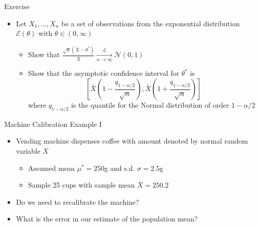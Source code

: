 \documentclass{beamer}
\begin{document}
\begin{frame}{Exercise}  
\begin{itemize} 
 \item Let $X_1, \ldots, X_n$ be a set of observations from the exponential distribution $\mathcal{E}(\theta)$ with $\theta \in (0, \infty)$ 
 \begin{itemize}
 \item Show that $\frac{\sqrt{n}(\bar{X} - \theta^*) }{\bar{X}} \xrightarrow[n \rightarrow \infty]{\mathcal{L}} \mathcal{N}(0, 1)$ 
 \item Show  that the asymptotic confidence interval for $\theta^*$ is 
 \begin{displaymath} 
  \left[\bar{X}\left(1 - \frac{q_{1-\alpha/2}}{\sqrt{n}}\right), \bar{X}\left(1 + \frac{q_{1-\alpha/2}}{\sqrt{n}}\right)  \right] 
 \end{displaymath}
  where $q_{1-\alpha/2}$ is the quantile for the Normal distribution of order $1-\alpha/2$ 
 \end{itemize} 
\end{itemize}
\end{frame}


\begin{frame}{Machine Calibration Example I}  
\begin{itemize} 
 \item Vending machine dispenses coffee with amount denoted by normal random variable $X$  
 \begin{itemize} 
  \item Assumed mean $\mu^* = 250$g and s.d. $\sigma = 2.5$g
  \item Sample 25 cups with sample mean $\bar{X} = 250.2$
 \end{itemize}
 \item Do we need to recalibrate the machine? 
 \item What is the error in our estimate of the population mean? 
\end{itemize}
\end{frame}
\end{document}
